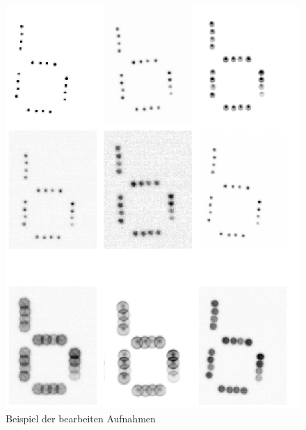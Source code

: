 \begin{figure}[H]
\centering
\includegraphics[scale=0.8]{pic/6Beispiel}
\caption{Beispiel der bearbeiten Aufnahmen} 
\end{figure}
\newpage
